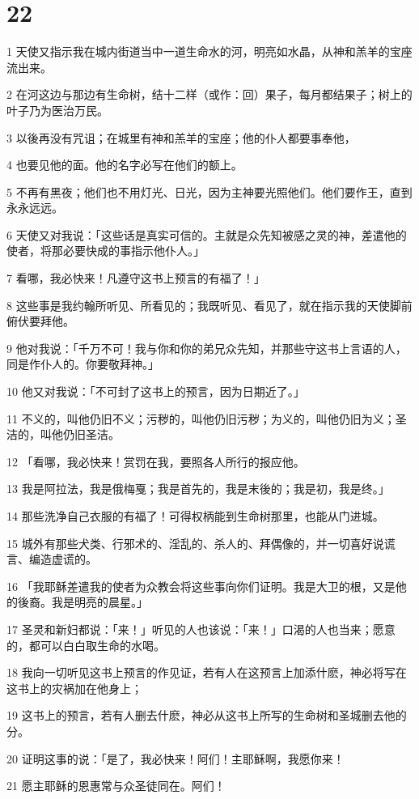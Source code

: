 \chapter{22}

\par 1 天使又指示我在城内街道当中一道生命水的河，明亮如水晶，从神和羔羊的宝座流出来。
\par 2 在河这边与那边有生命树，结十二样（或作：回）果子，每月都结果子；树上的叶子乃为医治万民。
\par 3 以後再没有咒诅；在城里有神和羔羊的宝座；他的仆人都要事奉他，
\par 4 也要见他的面。他的名字必写在他们的额上。
\par 5 不再有黑夜；他们也不用灯光、日光，因为主神要光照他们。他们要作王，直到永永远远。
\par 6 天使又对我说：「这些话是真实可信的。主就是众先知被感之灵的神，差遣他的使者，将那必要快成的事指示他仆人。」
\par 7 看哪，我必快来！凡遵守这书上预言的有福了！」
\par 8 这些事是我约翰所听见、所看见的；我既听见、看见了，就在指示我的天使脚前俯伏要拜他。
\par 9 他对我说：「千万不可！我与你和你的弟兄众先知，并那些守这书上言语的人，同是作仆人的。你要敬拜神。」
\par 10 他又对我说：「不可封了这书上的预言，因为日期近了。」
\par 11 不义的，叫他仍旧不义；污秽的，叫他仍旧污秽；为义的，叫他仍旧为义；圣洁的，叫他仍旧圣洁。
\par 12 「看哪，我必快来！赏罚在我，要照各人所行的报应他。
\par 13 我是阿拉法，我是俄梅戛；我是首先的，我是末後的；我是初，我是终。」
\par 14 那些洗净自己衣服的有福了！可得权柄能到生命树那里，也能从门进城。
\par 15 城外有那些犬类、行邪术的、淫乱的、杀人的、拜偶像的，并一切喜好说谎言、编造虚谎的。
\par 16 「我耶稣差遣我的使者为众教会将这些事向你们证明。我是大卫的根，又是他的後裔。我是明亮的晨星。」
\par 17 圣灵和新妇都说：「来！」听见的人也该说：「来！」口渴的人也当来；愿意的，都可以白白取生命的水喝。
\par 18 我向一切听见这书上预言的作见证，若有人在这预言上加添什麽，神必将写在这书上的灾祸加在他身上；
\par 19 这书上的预言，若有人删去什麽，神必从这书上所写的生命树和圣城删去他的分。
\par 20 证明这事的说：「是了，我必快来！阿们！主耶稣啊，我愿你来！
\par 21 愿主耶稣的恩惠常与众圣徒同在。阿们！


